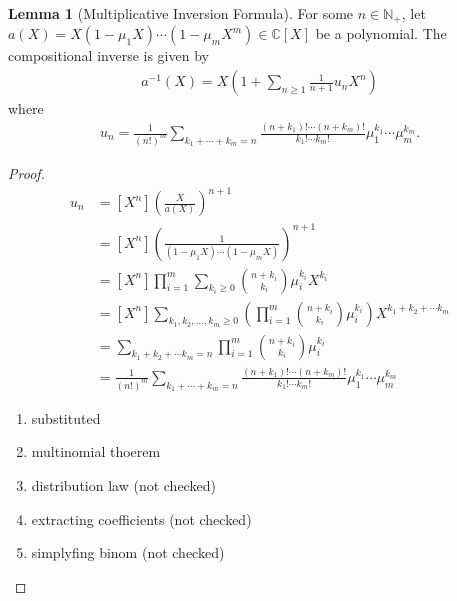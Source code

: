 \documentclass[a4paper]{article}
\theoremstyle{definition}
\newtheorem{lemma}[definition]{Lemma}
\begin{document}
%
\begin{lemma}[Multiplicative Inversion Formula]
    For some \(n \in \mathbb{N}_+\), let \(a(X) = X(1 - \mu_1 X) \cdots (1 - \mu_m X^m) \in \mathbb{C}[X]\) be a polynomial. The compositional inverse is given by
    \begin{align}
        a^{-1}(X) = X \left(1 + \sum_{n \geq 1} \frac{1}{n + 1} u_n X^n\right)
    \end{align}
    where
    \begin{align}
        u_n = \frac{1}{(n!)^m} \sum_{k_1 + \cdots + k_m = n} \frac{(n + k_1)! \cdots (n+k_m)!}{k_1! \cdots k_m!} \mu_1^{k_1} \cdots \mu_m^{k_m} \text{.}
    \end{align}
\end{lemma}
%
\begin{proof}
    \begin{align}
        u_n &= [X^n] \left(\frac{X}{a(X)}\right)^{n+1} \\
        &= [X^n] \left(\frac{1}{(1 - \mu_1 X) \cdots (1 - \mu_m X)}\right)^{n+1} \\
        &= [X^n] \prod_{i=1}^m \sum_{k_i \geq 0} \binom{n + k_i}{k_i} \mu_i^{k_i} X^{k_i} \\
        &= [X^n] \sum_{k_1, k_2, \ldots, k_m \geq 0} \left(\prod_{i=1}^m \binom{n + k_i}{k_i} \mu_i^{k_i}\right) X^{k_1 + k_2 + \cdots k_m} \\
        &= \sum_{k_1 + k_2 + \cdots k_m = n} \prod_{i=1}^m \binom{n+k_i}{k_i} \mu_i^{k_i} \\
        &= \frac{1}{(n!)^m} \sum_{k_1 + \cdots + k_m = n} \frac{(n + k_1)! \cdots (n+k_m)!}{k_1! \cdots k_m!} \mu_1^{k_1} \cdots \mu_m^{k_m} 
    \end{align}
    \begin{enumerate}
        \item substituted
        \item multinomial thoerem
        \item distribution law (not checked)
        \item extracting coefficients (not checked)
        \item simplyfing binom (not checked)
    \end{enumerate}
\end{proof}
\end{document}
